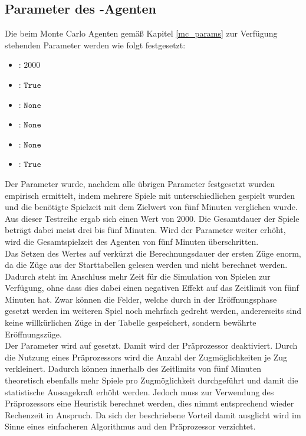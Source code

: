 \subsection{Parameter des -Agenten}
\label{eval:agents:params:subsec-mc}
Die beim Monte Carlo Agenten gemäß Kapitel \ref{mc_params} zur Verfügung stehenden Parameter werden wie folgt festgesetzt:
\begin{itemize}
\item {}: $2000$
\item {}: $\mathtt{True}$
\item {}: $\mathtt{None}$
\item {}: $\mathtt{None}$
\item {}: $\mathtt{None}$
\item {}: $\mathtt{True}$
\end{itemize}
Der Parameter  wurde, nachdem alle übrigen Parameter festgesetzt wurden  empirisch ermittelt, indem mehrere Spiele mit unterschiedlichen  gespielt wurden und die benötigte Spielzeit mit dem Zielwert von fünf Minuten verglichen wurde. Aus dieser Testreihe ergab sich einen  Wert von $2000$. Die Gesamtdauer der Spiele beträgt dabei meist drei bis fünf Minuten. Wird der Parameter weiter erhöht, wird die Gesamtspielzeit des Agenten von fünf Minuten überschritten.
\\Das Setzen des Wertes auf  verkürzt die Berechnungsdauer der ersten Züge enorm, da die Züge aus der Starttabellen gelesen werden und nicht berechnet werden. Dadurch steht im Anschluss mehr Zeit für die Simulation von Spielen zur Verfügung, ohne dass dies dabei einen negativen Effekt auf das Zeitlimit von fünf Minuten hat. Zwar können die Felder, welche durch in der Eröffnungsphase gesetzt werden im weiteren Spiel noch mehrfach gedreht werden, andererseits sind keine willkürlichen Züge in der Tabelle gespeichert, sondern bewährte Eröffnungszüge.
\\Der Parameter  wird auf  gesetzt. Damit wird der Präprozessor deaktiviert. Durch die Nutzung eines Präprozessors wird die Anzahl der Zugmöglichkeiten je Zug verkleinert. Dadurch können innerhalb des Zeitlimits von fünf Minuten theoretisch ebenfalls mehr Spiele pro Zugmöglichkeit durchgeführt und damit die statistische Aussagekraft erhöht werden. Jedoch muss zur Verwendung des Präprozessors eine Heuristik berechnet werden, dies nimmt entsprechend wieder Rechenzeit in Anspruch. Da sich der beschriebene Vorteil damit ausglicht wird im Sinne eines einfacheren Algorithmus aud den Präprozessor verzichtet.
